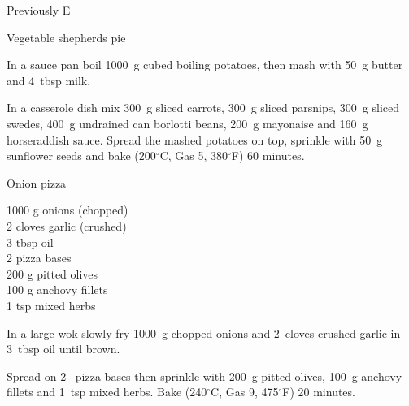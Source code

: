 \begin{menu}{Previously E}
\begin{recipe}{2}{Vegetable shepherds pie}
\begin{ingredients}
		\end{ingredients}
	
	
    \begin{instructions}
    \item 
        In a sauce pan boil
        1000~g cubed boiling potatoes,
        then mash with
        50~g  butter
        and
        4~tbsp  milk.
      \item 
        In a casserole dish mix
        300~g sliced carrots,
        300~g sliced parsnips,
        300~g sliced swedes,
        400~g undrained can borlotti beans,
        200~g  mayonaise
        and
        160~g  horseraddish sauce.
        Spread the mashed potatoes on top,
        sprinkle with
        50~g  sunflower seeds
        and
        bake 
      (200$^{\circ}$C, Gas 5, 380$^{\circ}$F)
     60 minutes.
      
    \end{instructions}
    \end{recipe}%
  
    \begin{recipe}{2}{Onion pizza}%
    
		\begin{ingredients}
		1000 g onions (chopped) \\
	2 cloves garlic (crushed) \\
	3 tbsp oil  \\
	2  pizza bases  \\
	200 g pitted olives  \\
	100 g anchovy fillets  \\
	1 tsp mixed herbs  \\
	
		\end{ingredients}
	
	
    \begin{instructions}
    \item 
        In a large wok slowly fry
        1000~g chopped onions
        and
        2~cloves crushed garlic
        in
        3~tbsp  oil
        until brown.
      \item 
        Spread on 2~  pizza bases
        then sprinkle with
        200~g  pitted olives,
        100~g  anchovy fillets
        and
        1~tsp  mixed herbs.
        Bake 
      (240$^{\circ}$C, Gas 9, 475$^{\circ}$F)
     20 minutes.
      
    \end{instructions}
    \end{recipe}%
  

\end{menu}
